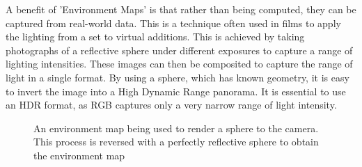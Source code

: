 \documentclass[ %
                    author={Gavin Parker},
                supervisor={Dr. Neill Campbell},
                    degree={MEng},
                     title={Deep Siamese Networks for Illumination Estimation from Stereo Images},
                  subtitle={},
                      type={research},
                      year={2018} ]{dissertation}
\begin{document}
\newline
A benefit of 'Environment Maps' is that rather than being computed, they can be captured from real-world data. This is a technique often used in films to apply the lighting from a set to virtual additions. This is achieved by taking photographs of a reflective sphere under different exposures to capture a range of lighting intensities. These images can then be composited to capture the range of light in a single format. By using a sphere, which has known geometry, it is easy to invert the image into a High Dynamic Range panorama. It is essential to use an HDR format, as RGB captures only a very narrow range of light intensity.
\begin{center}
\begin{figure}
\centering
{}
\label{environment map}
\caption{An environment map being used to render a sphere to the camera. This process is reversed with a perfectly reflective sphere to obtain the environment map}
\end{figure}
\end{center}
\end{document}
